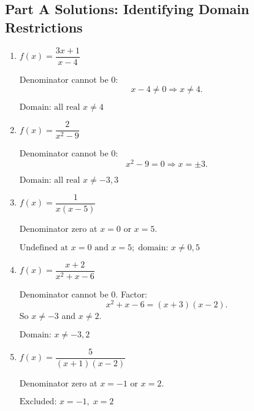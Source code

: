 \documentclass[12pt]{article}
\begin{document}
\subsection*{Part A Solutions: Identifying Domain Restrictions}
\begin{enumerate}
  \item \(f(x) = \dfrac{3x + 1}{x - 4}\)

  Denominator cannot be 0:
  \[
  x - 4 \ne 0 \Rightarrow x \ne 4.
  \]

  \(\boxed{\text{Domain: all real } x \ne 4}\)

  \item \(f(x) = \dfrac{2}{x^2 - 9}\)

  Denominator cannot be 0:
  \[
  x^2 - 9 = 0 \Rightarrow x = \pm 3.
  \]

  \(\boxed{\text{Domain: all real } x \ne -3, 3}\)

  \item \(f(x) = \dfrac{1}{x(x - 5)}\)

  Denominator zero at \(x = 0\) or \(x = 5.\)

  \(\boxed{\text{Undefined at } x = 0 \text{ and } x = 5;\; \text{domain: } x \ne 0, 5}\)

  \item \(f(x) = \dfrac{x + 2}{x^2 + x - 6}\)

  Denominator cannot be 0. Factor:
  \[
  x^2 + x - 6 = (x + 3)(x - 2).
  \]
  So \(x \ne -3\) and \(x \ne 2.\)

  \(\boxed{\text{Domain: } x \ne -3, 2}\)

  \item \(f(x) = \dfrac{5}{(x + 1)(x - 2)}\)

  Denominator zero at \(x = -1\) or \(x = 2.\)

  \(\boxed{\text{Excluded: } x = -1,\; x = 2}\)
\end{enumerate}
\end{document}

